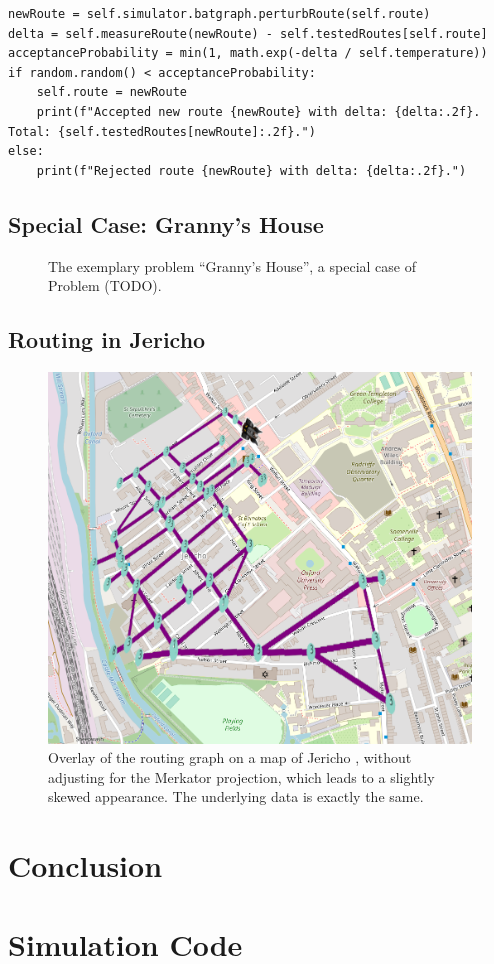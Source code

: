 \documentclass{prettytex/ox/mmsc-special-topic}
\begin{document}
  \begin{verbatim}
newRoute = self.simulator.batgraph.perturbRoute(self.route)
delta = self.measureRoute(newRoute) - self.testedRoutes[self.route]
acceptanceProbability = min(1, math.exp(-delta / self.temperature))
if random.random() < acceptanceProbability:
    self.route = newRoute
    print(f"Accepted new route {newRoute} with delta: {delta:.2f}. Total: {self.testedRoutes[newRoute]:.2f}.")
else:
    print(f"Rejected route {newRoute} with delta: {delta:.2f}.")
  \end{verbatim}

  \subsection{Special Case: Granny's House}
  \begin{figure}[H]
    \centering
    \caption{The exemplary problem ``Granny's House'', a special case of Problem (TODO).}
  \end{figure}

  \subsection{Routing in Jericho}
  \begin{figure}[H]
    \centering
    \includegraphics[width=0.6\linewidth]{figures/jericho.png}
    \caption{Overlay of the routing graph on a map of Jericho \parencite{osm}, without adjusting for the Merkator projection, which leads to a slightly skewed appearance. The underlying data is exactly the same.}
  \end{figure}

  \section{Conclusion}

  \pagebreak
  \printbibliography

  \pagebreak
  \appendix
  \section{Simulation Code}
  \inputminted{python}{../simulator/optimiser.py}
\end{document}
